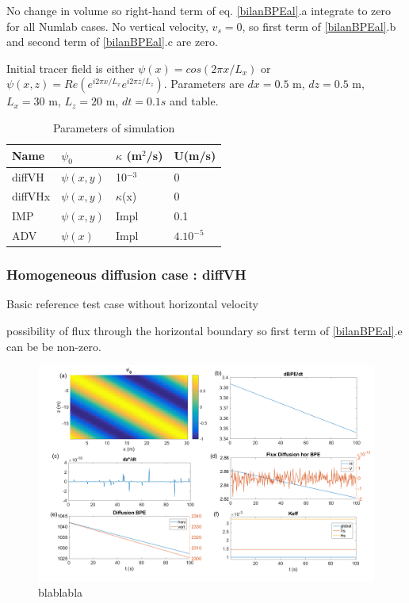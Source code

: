 No change in volume so right-hand term of eq. \ref{bilanBPEal}.a integrate to zero for all Numlab cases. No vertical velocity, $v_s=0$, so first term of \ref{bilanBPEal}.b and second term of \ref{bilanBPEal}.c are zero.

Initial tracer field is either $\psi(x)=cos(2\pi x/L_x)$ or $\psi(x,z)=Re(e^{i2\pi x/L_x}e^{i 2 \pi z/L_z})$. Parameters are $dx=0.5$ m, $dz=0.5$ m, $L_x=30$ m, $L_z=20$ m, $dt=0.1s$ and table.


\begin{table}[h!]
\centering
\begin{tabular}{|l|l|l|l|}
\hline
Name & $\psi_0$ & $\kappa$ (m$^2$/s)& U(m/s)\\
\hline
diffVH & $\psi(x,y)$ & 10$^{-3}$& 0\\
diffVHx & $\psi(x,y)$ & $\kappa$(x) & 0\\
IMP & $\psi(x,y)$ & Impl & 0.1\\
ADV & $\psi(x)$ & Impl & $4.10^{-5}$\\
\hline
\end{tabular}
\caption{Parameters of simulation}
\end{table}

\subsubsection{Homogeneous diffusion case : diffVH}
Basic reference test case without horizontal velocity

possibility of flux through the horizontal boundary so first term of \ref{bilanBPEal}.e can be be non-zero.

\begin{figure}[h!]
\centering
\includegraphics[width=1\textwidth]{./CHAP_BPE/AGBPE_numlab1.png}
\caption{blablabla}
\label{fig1numlab}
\end{figure}

